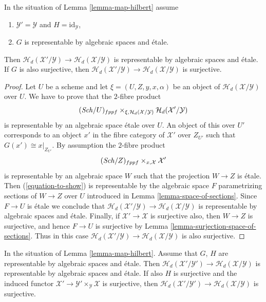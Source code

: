 \begin{lemma}
\label{lemma-etale-covering-hilbert}
In the situation of
Lemma \ref{lemma-map-hilbert}
assume
\begin{enumerate}
\item $\mathcal{Y}' = \mathcal{Y}$ and $H = \text{id}_\mathcal{Y}$,
\item $G$ is representable by algebraic spaces and \'etale.
\end{enumerate}
Then $\mathcal{H}_d(\mathcal{X}'/\mathcal{Y}) \to
\mathcal{H}_d(\mathcal{X}/\mathcal{Y})$ is representable by
algebraic spaces and \'etale.
If $G$ is also surjective, then
$\mathcal{H}_d(\mathcal{X}'/\mathcal{Y}) \to
\mathcal{H}_d(\mathcal{X}/\mathcal{Y})$ is surjective.
\end{lemma}

\begin{proof}
Let $U$ be a scheme and let $\xi = (U, Z, y, x, \alpha)$ be an object of
$\mathcal{H}_d(\mathcal{X}/\mathcal{Y})$ over $U$.
We have to prove that the $2$-fibre product
\begin{equation}
\label{equation-to-show}
(\mathit{Sch}/U)_{fppf}
\times_{\xi, \mathcal{H}_d(\mathcal{X}/\mathcal{Y})}
\mathcal{H}_d(\mathcal{X}'/\mathcal{Y})
\end{equation}
is representable by an algebraic space \'etale over $U$.
An object of this over $U'$ corresponds to an object
$x'$ in the fibre category of $\mathcal{X}'$ over $Z_{U'}$
such that $G(x') \cong x|_{Z_{U'}}$.
By assumption the $2$-fibre product
$$
(\mathit{Sch}/Z)_{fppf} \times_{x, \mathcal{X}} \mathcal{X}'
$$
is representable by an algebraic space $W$ such that the projection
$W \to Z$ is \'etale. Then (\ref{equation-to-show})
is representable by the algebraic space $F$ parametrizing sections of
$W \to Z$ over $U$ introduced in
Lemma \ref{lemma-space-of-sections}.
Since $F \to U$ is \'etale we conclude that
$\mathcal{H}_d(\mathcal{X}'/\mathcal{Y}) \to
\mathcal{H}_d(\mathcal{X}/\mathcal{Y})$ is representable by
algebraic spaces and \'etale.
Finally, if $\mathcal{X}' \to \mathcal{X}$ is surjective also,
then $W \to Z$ is surjective, and hence $F \to U$ is surjective by
Lemma \ref{lemma-surjection-space-of-sections}.
Thus in this case
$\mathcal{H}_d(\mathcal{X}'/\mathcal{Y}) \to
\mathcal{H}_d(\mathcal{X}/\mathcal{Y})$ is also surjective.
\end{proof}

\begin{lemma}
\label{lemma-etale-map-hilbert}
In the situation of
Lemma \ref{lemma-map-hilbert}.
Assume that $G$, $H$ are representable by algebraic spaces and \'etale.
Then $\mathcal{H}_d(\mathcal{X}'/\mathcal{Y}') \to
\mathcal{H}_d(\mathcal{X}/\mathcal{Y})$ is representable by
algebraic spaces and \'etale.
If also $H$ is surjective and the induced functor
$\mathcal{X}' \to \mathcal{Y}' \times_\mathcal{Y} \mathcal{X}$
is surjective, then
$\mathcal{H}_d(\mathcal{X}'/\mathcal{Y}') \to
\mathcal{H}_d(\mathcal{X}/\mathcal{Y})$ is surjective.
\end{lemma}

